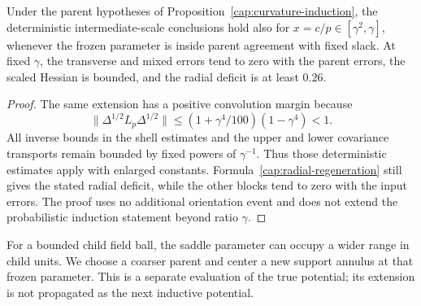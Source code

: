 \begin{lemma}
\label{cap:deterministic-evaluation}
Under the parent hypotheses of Proposition~\ref{cap:curvature-induction},
the deterministic intermediate-scale conclusions hold also for
\(x=c/p\in[\gamma^2,\gamma]\), whenever the frozen parameter is inside
parent agreement with fixed slack. At fixed \(\gamma\), the transverse
and mixed errors tend to zero with the parent errors, the scaled Hessian
is bounded, and the radial deficit is at least \(0.26\).
\end{lemma}
\begin{proof}
The same extension has a positive convolution margin because
\[
 \|\Delta^{1/2}L_p\Delta^{1/2}\|
 \le(1+\gamma^4/100)(1-\gamma^4)<1.
\]
All inverse bounds in the shell estimates and the upper and lower
covariance transports remain bounded by fixed powers of
\(\gamma^{-1}\). Thus those deterministic estimates apply with enlarged
constants. Formula~\eqref{cap:radial-regeneration} still gives the stated
radial deficit, while the other blocks tend to zero with the input errors.
The proof uses no additional orientation event and does not extend the
probabilistic induction statement beyond ratio \(\gamma\).
\end{proof}

For a bounded child field ball, the saddle parameter can occupy a wider
range in child units. We choose a coarser parent and center a new support
annulus at that frozen parameter. This is a separate evaluation of the
true potential; its extension is not propagated as the next inductive
potential.

